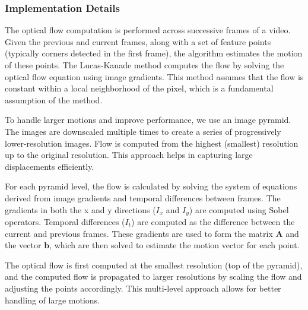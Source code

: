 \documentclass[11pt, conference, letterpaper]{IEEEtran}
\begin{document}
\subsubsection{Implementation Details}
The optical flow computation is performed across successive frames of a video. Given the previous and current frames, along with a set of feature points (typically corners detected in the first frame), the algorithm estimates the motion of these points. The Lucas-Kanade method computes the flow by solving the optical flow equation using image gradients. This method assumes that the flow is constant within a local neighborhood of the pixel, which is a fundamental assumption of the method.

To handle larger motions and improve performance, we use an image pyramid. The images are downscaled multiple times to create a series of progressively lower-resolution images. Flow is computed from the highest (smallest) resolution up to the original resolution. This approach helps in capturing large displacements efficiently.

For each pyramid level, the flow is calculated by solving the system of equations derived from image gradients and temporal differences between frames. The gradients in both the x and y directions (\(I_x\) and \(I_y\)) are computed using Sobel operators. Temporal differences (\(I_t\)) are computed as the difference between the current and previous frames. These gradients are used to form the matrix \(\mathbf{A}\) and the vector \(\mathbf{b}\), which are then solved to estimate the motion vector for each point.

The optical flow is first computed at the smallest resolution (top of the pyramid), and the computed flow is propagated to larger resolutions by scaling the flow and adjusting the points accordingly. This multi-level approach allows for better handling of large motions.
\end{document}

